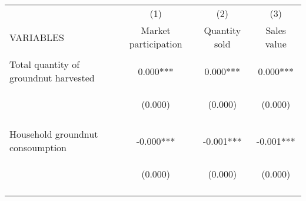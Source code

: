 \begin{center}
\begin{tabular}{lccc} \hline
 & (1) & (2) & (3) \\
VARIABLES & Market participation & Quantity sold & Sales value \\ \hline
\vspace{4pt} & \begin{footnotesize}\end{footnotesize} & \begin{footnotesize}\end{footnotesize} & \begin{footnotesize}\end{footnotesize} \\
Total quantity of groundnut harvested & 0.000*** & 0.000*** & 0.000*** \\
 & \begin{footnotesize}(0.000)\end{footnotesize} & \begin{footnotesize}(0.000)\end{footnotesize} & \begin{footnotesize}(0.000)\end{footnotesize} \\
\vspace{4pt} & \begin{footnotesize}[0.000]\end{footnotesize} & \begin{footnotesize}[0.000]\end{footnotesize} & \begin{footnotesize}[0.000]\end{footnotesize} \\
Household groundnut consoumption & -0.000*** & -0.001*** & -0.001*** \\
 & \begin{footnotesize}(0.000)\end{footnotesize} & \begin{footnotesize}(0.000)\end{footnotesize} & \begin{footnotesize}(0.000)\end{footnotesize} \\
\vspace{4pt} & \begin{footnotesize}[0.000]\end{footnotesize} & \begin{footnotesize}[0.000]\end{footnotesize} & \begin{footnotesize}[0.000]\end{footnotesize} \\

\end{tabular}
\end{center}
